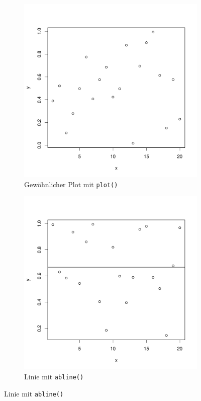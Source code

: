 \begin{figure}[h!]
\centering
\begin{subfigure}[b]{0.48\textwidth}
\includegraphics{r-cmd-013}
\caption{Gewöhnlicher Plot mit \lstinline{plot()}}
\end{subfigure}
\begin{subfigure}[b]{0.48\textwidth}
\includegraphics{r-cmd-014}
\caption{Linie mit \lstinline{abline()}}
\end{subfigure}


\end{figure}

